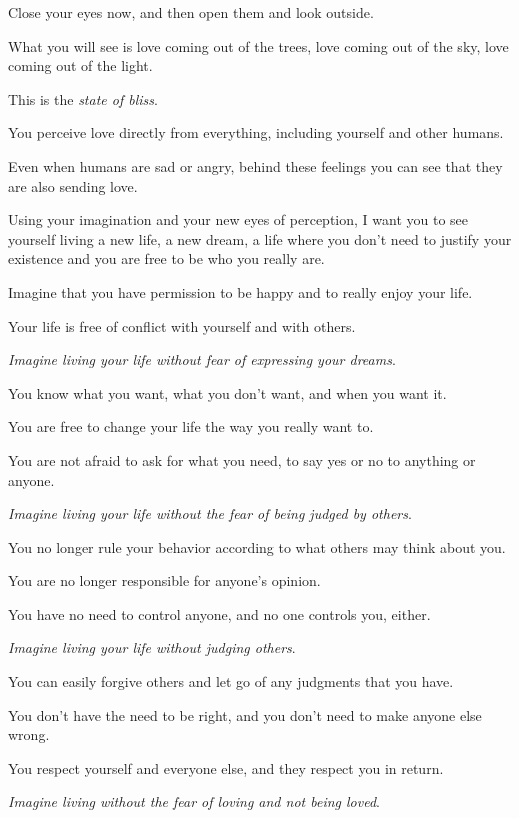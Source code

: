 \documentclass{article}
\numberwithin{equation}{section}
\begin{document}
%
Close your eyes now, and then open them and look outside.

%
What you will see is love coming out of the trees, love coming out of the sky, love coming out of the light.


This is the \textit{state of bliss}.

You perceive love directly from everything, including yourself and other humans.

Even when humans are sad or angry, behind these feelings you can see that they are also sending love.

%
Using your imagination and your new eyes of perception, I want you to see yourself living a new life, a new dream, a life where you don't need to justify your existence and you are free to be who you really are.

%
Imagine that you have permission to be happy and to really enjoy your life.

Your life is free of conflict with yourself and with others.

%
\textit{Imagine living your life without fear of expressing your dreams}.

You know what you want, what you don't want, and when you want it.

You are free to change your life the way you really want to.

You are not afraid to ask for what you need, to say yes or no to anything or anyone.

%
\textit{Imagine living your life without the fear of being judged by others}.

You no longer rule your behavior according to what others may think about you.

You are no longer responsible for anyone's opinion.

You have no need to control anyone, and no one controls you, either.

%
\textit{Imagine living your life without judging others}.

You can easily forgive others and let go of any judgments that you have.

You don't have the need to be right, and you don't need to make anyone else wrong.

You respect yourself and everyone else, and they respect you in return.

%
\textit{Imagine living without the fear of loving and not being loved}.
\end{document}
